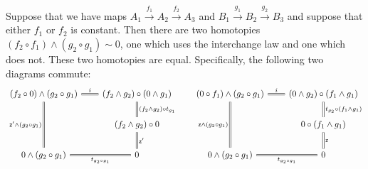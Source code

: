 \documentclass{article}
\newcommand{\lpmap}{\xrightarrow}
\newcommand{\smsh}{\wedge}
\renewcommand{\o}{\ensuremath{\circ}}
\newcommand{\zeroh}{\mathsf{z}}
\begin{document}
\begin{lem}\label{lem:smash-coh}
 	Suppose that we have maps $A_1\lpmap{f_1}A_2\lpmap{f_2}A_3$ and $B_1\lpmap{g_1}B_2\lpmap{g_2}B_3$
 	and suppose that either $f_1$ or $f_2$ is constant. Then there are two homotopies
  $(f_2 \o f_1)\smsh (g_2 \o g_1)\sim 0$, one which uses the interchange law and one which does not. These two homotopies are equal. Specifically, the following two diagrams commute:
	\begin{equation}\label{eq:pent-statement}
	\begin{tikzcd}[column sep=2em]
		(f_2 \o 0)\smsh (g_2 \o g_1)
			\arrow[r, equals, "i"]
			\arrow[dd, swap, equals, "\zeroh' \smsh (g_2 \o g_1)"]
		&(f_2 \smsh g_2)\o (0 \smsh g_1)
			\arrow[d, equals, "(f_2 \smsh g_2) \o t_{g_1}"]
		& (0 \o f_1)\smsh (g_2 \o g_1)
			\arrow[r, equals, "i"]
			\arrow[dd, swap, equals, "\zeroh \smsh (g_2 \o g_1)"]
		& (0 \smsh g_2)\o (f_1 \smsh g_1)
			\arrow[d,equals, "t_{g_2} \o (f_1 \smsh g_1)"]
		\\
		& (f_2 \smsh g_2)\o 0
			\arrow[d,equals, "\zeroh'"]
		&& 0\o (f_1 \smsh g_1)
			\arrow[d,equals, "\zeroh"]
		\\
		0\smsh (g_2 \o g_1)
			\arrow[r,equals, swap, "t_{g_2 \o g_1}"]
		& 0
		& 0\smsh (g_2 \o g_1)
			\arrow[r,swap, equals, "t_{g_2 \o g_1}"]
		& 0
	\end{tikzcd}
	\end{equation}

\end{lem}
\end{document}
